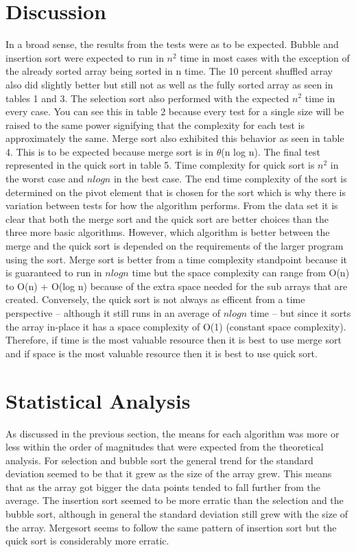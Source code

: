 \documentclass[12pt]{report}
\begin{document}
\section*{Discussion}
	In a broad sense, the results from the tests were as to be expected.
	Bubble and insertion sort were expected to run in $n^2$ time in most
	cases with the exception of the already sorted array being sorted
	in n time. The 10 percent shuffled array also did slightly better but
	still not as well as the fully sorted array as seen in tables 1 and 3. 
	The selection sort also performed with the expected $n^2$ time in every 
	case. You can see this in table 2 because every test for a single 
	size will be raised to the same power signifying that the complexity
	for each test is approximately the same. Merge sort also exhibited
	this behavior as seen in table 4. This is to be expected because merge
	sort is in $\theta$(n log n). The final test represented in the quick 
	sort in table 5. Time complexity for quick sort is $n^2$ in the worst 
	case and $n log n$ in the best case. The end time complexity of the 
	sort is determined on the pivot element that is chosen for the sort
	which is why there is variation between tests for how the algorithm
	performs. From the data set it is clear that both the merge sort and
	the quick sort are better choices than the three more basic algorithms.
	However, which algorithm is better between the merge and the quick sort
	is depended on the requirements of the larger program using the sort. 
	Merge sort is better from a time complexity standpoint because it is 
	guaranteed to run in $n log n$ time but the space complexity can
	range from O(n) to O(n) + O(log n) because of the extra space needed
	for the sub arrays that are created. Conversely, the quick sort is not
	always as efficent from a time perspective -- although it still runs in an average of $n log n$ time -- but since it sorts the array
	in-place it has a space complexity of O(1) (constant space complexity).
	Therefore, if time is the most valuable resource then it is best to use 
	merge sort and if space is the most valuable resource then it is best to 
	use quick sort.


\section*{Statistical Analysis}
	As discussed in the previous section, the means for each algorithm was
	more or less within the order of magnitudes that were expected from 
	the theoretical analysis. For selection and bubble sort the general
	trend for the standard deviation seemed to be that it grew as the size
	of the array grew. This means that as the array got bigger the data points
	tended to fall further from the average. The insertion sort seemed to be 
	more erratic than the selection and the bubble sort, although in general
	the standard deviation still grew with the size of the array. Mergesort 
	seems to follow the same pattern of insertion sort but the quick sort is 
	considerably more erratic.
\end{document}
